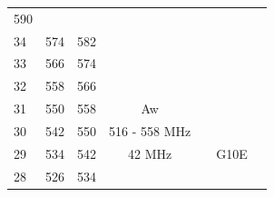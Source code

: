 \begin{longtable}[H]{|p{1cm}|p{1cm}|p{1cm}|cc|cc|}
                  \cellcolor[HTML]{FFCCC9}590 &
                  \multicolumn{1}{c|}{\cellcolor[HTML]{FF2CFE}} &
                   &
                  \multicolumn{1}{c|}{\cellcolor[HTML]{FF2CFE}} &
                   \\ \cline{1-3}
                \cellcolor[HTML]{FFCCC9}34 &
                  \cellcolor[HTML]{FFCCC9}574 &
                  \cellcolor[HTML]{FFCCC9}582 &
                  \multicolumn{1}{c|}{\cellcolor[HTML]{FF2CFE}} &
                   &
                  \multicolumn{1}{c|}{\cellcolor[HTML]{FF2CFE}} &
                   \\ \cline{1-3}
                \cellcolor[HTML]{FFCCC9}33 &
                  \cellcolor[HTML]{FFCCC9}566 &
                  \cellcolor[HTML]{FFCCC9}574 &
                  \multicolumn{1}{c|}{\cellcolor[HTML]{FF2CFE}} &
                   &
                  \multicolumn{1}{c|}{\cellcolor[HTML]{FF2CFE}} &
                   \\ \cline{1-3}
                \cellcolor[HTML]{FFCCC9}32 &
                  \cellcolor[HTML]{FFCCC9}558 &
                  \cellcolor[HTML]{FFCCC9}566 &
                  \multicolumn{1}{c|}{\cellcolor[HTML]{FF2CFE}} &
                   &
                  \multicolumn{1}{c|}{\cellcolor[HTML]{FF2CFE}} &
                   \\ \cline{1-4}
                \cellcolor[HTML]{FFCCC9}31 &
                  \cellcolor[HTML]{FFCCC9}550 &
                  \cellcolor[HTML]{FFCCC9}558 &
                  \multicolumn{1}{c|}{\cellcolor[HTML]{FF3131}Aw} &
                   &
                  \multicolumn{1}{c|}{\cellcolor[HTML]{FF2CFE}} &
                   \\ \cline{1-3} \cline{6-6}
                \cellcolor[HTML]{9AFF99}30 &
                  \cellcolor[HTML]{9AFF99}542 &
                  \cellcolor[HTML]{9AFF99}550 &
                  \multicolumn{1}{c|}{\cellcolor[HTML]{FF3131}516 - 558 MHz} &
                   &
                   &
                   \\ \cline{1-3} \cline{6-6}
                \cellcolor[HTML]{9AFF99}29 &
                  \cellcolor[HTML]{9AFF99}534 &
                  \cellcolor[HTML]{9AFF99}542 &
                  \multicolumn{1}{c|}{\cellcolor[HTML]{FF3131}42 MHz} &
                   &
                  \multicolumn{1}{c|}{\cellcolor[HTML]{FF3131}G10E} &
                   \\ \cline{1-3}
                \cellcolor[HTML]{9AFF99}28 &
                  \cellcolor[HTML]{9AFF99}526 &
                  \cellcolor[HTML]{9AFF99}534 &

\end{longtable}
